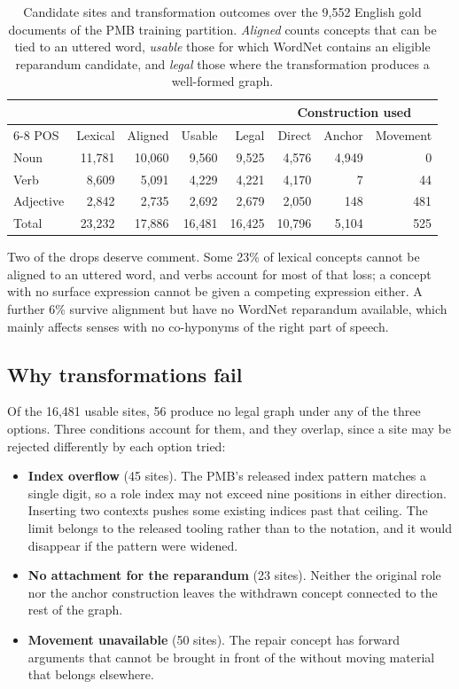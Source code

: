 \begin{table}[ht]
\centering
\small
\begin{tabular}{@{}lrrrrrrr@{}}
\toprule
& & & & & \multicolumn{3}{c}{Construction used} \\
\cmidrule(l){6-8}
POS & Lexical & Aligned & Usable & Legal & Direct & Anchor & Movement \\
\midrule
Noun      & 11,781 & 10,060 & 9,560 & 9,525 & 4,576 & 4,949 &   0 \\
Verb      &  8,609 &  5,091 & 4,229 & 4,221 & 4,170 &     7 &  44 \\
Adjective &  2,842 &  2,735 & 2,692 & 2,679 & 2,050 &   148 & 481 \\
\midrule
Total     & 23,232 & 17,886 & 16,481 & 16,425 & 10,796 & 5,104 & 525 \\
\bottomrule
\end{tabular}
\caption{Candidate sites and transformation outcomes over the 9,552 English
gold documents of the PMB training partition. \emph{Aligned} counts concepts
that can be tied to an uttered word, \emph{usable} those for which WordNet
contains an eligible reparandum candidate, and \emph{legal} those where the transformation produces a
well-formed graph.}
\label{tab:devices-coverage}
\end{table}

Two of the drops deserve comment. Some 23\% of lexical concepts cannot be
aligned to an uttered word, and verbs account for most of that loss; a concept
with no surface expression cannot be given a competing expression either. A
further 6\% survive alignment but have no WordNet reparandum available, which
mainly affects senses with no co-hyponyms of the right part of speech.

\subsection{Why transformations fail}
\label{app:devices-blockers}

Of the 16,481 usable sites, 56 produce no legal graph under any of the three
options. Three conditions account for them, and they overlap, since a site may
be rejected differently by each option tried:

\begin{itemize}[nosep]
  \item \textbf{Index overflow} (45 sites). The PMB's released index pattern
    matches a single digit, so a role index may not exceed nine positions in
    either direction. Inserting two contexts pushes some existing indices past
    that ceiling. The limit belongs to the released tooling rather than to the
    notation, and it would disappear if the pattern were widened.
  \item \textbf{No attachment for the reparandum} (23 sites). Neither the
    original role nor the anchor construction leaves the withdrawn concept
    connected to the rest of the graph.
  \item \textbf{Movement unavailable} (50 sites). The repair concept has
    forward arguments that cannot be brought in front of the
     without moving material that belongs elsewhere.
\end{itemize}

